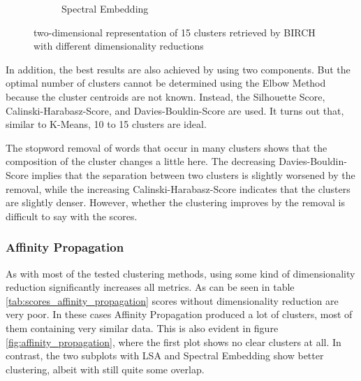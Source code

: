 \begin{figure}
\begin{subfigure}{.3\textwidth}
  \caption{Spectral Embedding}
  \label{fig:birch_spectral}
\end{subfigure}
\caption{two-dimensional representation of 15 clusters retrieved by BIRCH with different dimensionality reductions}
\label{fig:birch}
\end{figure}
In addition, the best results are also achieved by using two components.
But the optimal number of clusters cannot be determined using the Elbow Method because the cluster centroids are not known.
Instead, the Silhouette Score, Calinski-Harabasz-Score, and Davies-Bouldin-Score are used.
It turns out that, similar to K-Means, 10 to 15 clusters are ideal.

The stopword removal of words that occur in many clusters shows that the composition of the cluster changes a little here.
The decreasing Davies-Bouldin-Score implies that the separation between two clusters is slightly worsened by the removal, while the increasing Calinski-Harabasz-Score indicates that the clusters are slightly denser.
However, whether the clustering improves by the removal is difficult to say with the scores.

\subsubsection{Affinity Propagation}

As with most of the tested clustering methods, using some kind of dimensionality reduction significantly increases all metrics. As can be seen in table \ref{tab:scores_affinity_propagation} scores without dimensionality reduction are very poor.
In these cases Affinity Propagation produced a lot of clusters, most of them containing very similar data. This is also evident in figure \ref{fig:affinity_propagation}, where the first plot shows no clear clusters at all. In contrast, the two subplots with LSA and Spectral Embedding show better clustering, albeit with still quite some overlap. 

